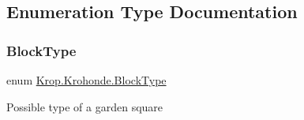 \subsection{Enumeration Type Documentation}
\mbox{\label{namespace_krop_1_1_krohonde_ae5fde399eea87be9e3c80744c3d73029}} 
\subsubsection{\texorpdfstring{Block\+Type}{BlockType}}
{\footnotesize\ttfamily enum \mbox{\hyperlink{namespace_krop_1_1_krohonde_ae5fde399eea87be9e3c80744c3d73029}{Krop.\+Krohonde.\+Block\+Type}}\hspace{0.3cm}{\ttfamily [strong]}}



Possible type of a garden square 


